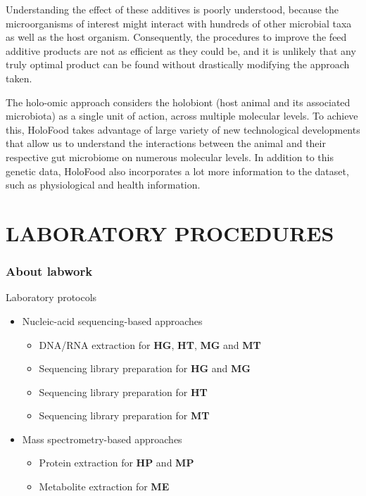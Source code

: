 \documentclass[
]{article}
\providecommand{\tightlist}{%
  \setlength{\itemsep}{0pt}\setlength{\parskip}{0pt}}
\begin{document}
Understanding the effect of these additives is poorly understood, because the microorganisms of interest might interact with hundreds of other microbial taxa as well as the host organism. Consequently, the procedures to improve the feed additive products are not as efficient as they could be, and it is unlikely that any truly optimal product can be found without drastically modifying the approach taken.

The holo-omic approach considers the holobiont (host animal and its associated microbiota) as a single unit of action, across multiple molecular levels. \hspace{0pt}To achieve this, HoloFood takes advantage of large variety of new technological developments that allow us to understand the interactions between the animal and their respective gut microbiome on numerous molecular levels. In addition to this genetic data, HoloFood also incorporates a lot more information to the dataset, such as physiological and health information.

\hypertarget{part-laboratory-procedures}{%
\part{LABORATORY PROCEDURES}\label{part-laboratory-procedures}}

\hypertarget{about-labwork}{%
\section{About labwork}\label{about-labwork}}

Laboratory protocols

\begin{itemize}
\tightlist
\item
  Nucleic-acid sequencing-based approaches

  \begin{itemize}
  \tightlist
  \item
    DNA/RNA extraction for \textbf{HG}, \textbf{HT}, \textbf{MG} and \textbf{MT}
  \item
    Sequencing library preparation for \textbf{HG} and \textbf{MG}
  \item
    Sequencing library preparation for \textbf{HT}
  \item
    Sequencing library preparation for \textbf{MT}
  \end{itemize}
\item
  Mass spectrometry-based approaches

  \begin{itemize}
  \tightlist
  \item
    Protein extraction for \textbf{HP} and \textbf{MP}
  \item
    Metabolite extraction for \textbf{ME}
  \end{itemize}
\end{itemize}
\end{document}
